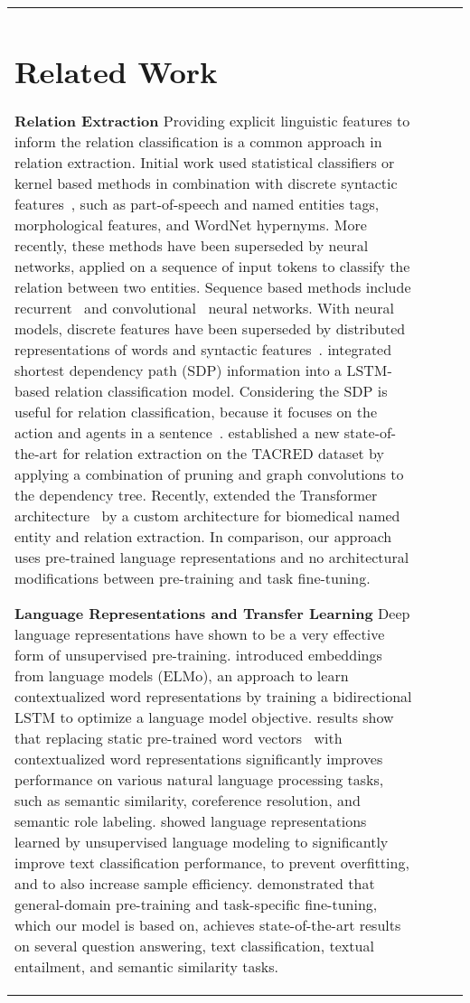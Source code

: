 \documentclass[akbc,twoside,11pt]{article}
\begin{document}
\begin{table}[ht!]
\begin{tabular}{p{6cm} l l l}
\section{Related Work}
\label{related_work}
\noindent  \textbf{Relation Extraction} \quad Providing explicit linguistic features to inform the relation classification is a common approach in relation extraction. Initial work used statistical classifiers or kernel based methods in combination with discrete syntactic features~\cite{zelenko_kernel_2003, mintz_distantsf_2009, hendrickx_semeval2010t8_2010}, such as part-of-speech and named entities tags, morphological features, and WordNet hypernyms. More recently, these methods have been superseded by neural networks, applied on a sequence of input tokens to classify the relation between two entities. Sequence based methods include recurrent~\cite{socher_semanticct_2012, zhang_relationcv_2015} and convolutional~\cite{zeng_relationcv_2014, zeng_distant_2015} neural networks. With neural models, discrete features have been superseded by distributed representations of words and syntactic features~\cite{turian_wordra_2010, pennington_glove_2014}. \citet{xu_semanticrc_2015, xu_classifyingrv_2015} integrated shortest dependency path (SDP) information into a LSTM-based relation classification model. Considering the SDP is useful for relation classification, because it focuses on the action and agents in a sentence~\cite{bunescu_shortest_2005,socher_groundedcs_2014}. \citet{zhang_graphco_2018} established a new state-of-the-art for relation extraction on the TACRED dataset by applying a combination of pruning and graph convolutions to the dependency tree.
Recently, \citet{verga_transformer_2018} extended the Transformer architecture~\cite{vaswani_attention_2017} by a custom architecture  for biomedical named entity and relation extraction. In comparison, our approach uses pre-trained language representations and no architectural modifications between pre-training and task fine-tuning.

\noindent \textbf{Language Representations and Transfer Learning} \quad
Deep language representations have shown to be a very effective form of unsupervised pre-training. \cite{peters_deepcw_2018} introduced embeddings from language models (ELMo), an approach to learn contextualized word representations by training a bidirectional LSTM to optimize a language model objective. \citet{peters_deepcw_2018} results show that replacing static pre-trained word vectors~\cite{mikolov_efficienteo_2013,pennington_glove_2014} with contextualized word representations significantly improves performance on various natural language processing tasks, such as  semantic similarity, coreference resolution, and semantic role labeling. \citet{ruder_universallm_2018} showed language representations learned by unsupervised language modeling to significantly improve text classification performance, to prevent overfitting, and to also increase sample efficiency. \cite{radford_improvinglu_2018} demonstrated that general-domain pre-training and task-specific fine-tuning, which our model is based on, achieves state-of-the-art results on several question answering, text classification, textual entailment, and semantic similarity tasks.



\end{tabular}
\end{table}
\end{document}
